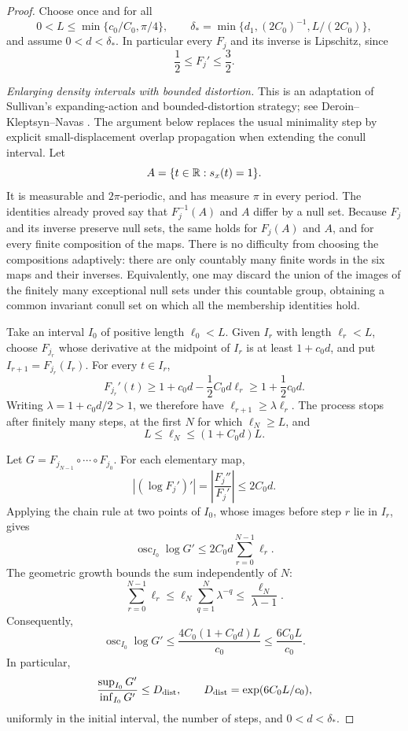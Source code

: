 \begin{proof}
Choose once and for all
\[
 0<L\le\min\{c_0/C_0,\pi/4\},
 \qquad
 \delta_*=\min\{d_1,(2C_0)^{-1},L/(2C_0)\},
\]
and assume \(0<d<\delta_*\).  In particular every \(F_j\) and its
inverse is Lipschitz, since
\[
 \frac12\le F_j'\le\frac32.
\]

\smallskip
\noindent\emph{Enlarging density intervals with bounded distortion.}
This is an adaptation of Sullivan's expanding-action and bounded-distortion
strategy; see Deroin--Kleptsyn--Navas \cite[Section~2.1]{DeroinKleptsynNavas2008}.
The argument below replaces the usual minimality step by explicit
small-displacement overlap propagation when extending the conull interval.
Let
\[
 A=\{t\in\mathbb R:s_x(t)=1\}.
\]
It is measurable and \(2\pi\)-periodic, and has measure \(\pi\)
in every period.  The identities already proved say that
\(F_j^{-1}(A)\) and \(A\) differ by a null set.  Because \(F_j\)
and its inverse preserve null sets, the same holds for
\(F_j(A)\) and \(A\), and for every finite composition of the maps.
There is no difficulty from choosing the compositions adaptively:
there are only countably many finite words in the six maps and
their inverses.  Equivalently, one may discard the union of the
images of the finitely many exceptional null sets under this
countable group, obtaining a common invariant conull set on which
all the membership identities hold.

Take an interval \(I_0\) of positive length \(\ell_0<L\).
Given \(I_r\) with length \(\ell_r<L\), choose \(F_{j_r}\) whose
derivative at the midpoint of \(I_r\) is at least \(1+c_0d\), and
put \(I_{r+1}=F_{j_r}(I_r)\).  For every \(t\in I_r\),
\[
 F_{j_r}'(t)
 \ge1+c_0d-\frac12C_0d\ell_r
 \ge1+\frac12c_0d.
\]
Writing \(\lambda=1+c_0d/2>1\), we therefore have
\(\ell_{r+1}\ge\lambda\ell_r\).  The process stops after finitely
many steps, at the first \(N\) for which \(\ell_N\ge L\), and
\[
 L\le\ell_N\le(1+C_0d)L.
\]

Let \(G=F_{j_{N-1}}\circ\cdots\circ F_{j_0}\).
For each elementary map,
\[
 |(\log F_j')'|=\left|\frac{F_j''}{F_j'}\right|\le2C_0d.
\]
Applying the chain rule at two points of \(I_0\), whose images
before step \(r\) lie in \(I_r\), gives
\[
 \operatorname{osc}_{I_0}\log G'
 \le2C_0d\sum_{r=0}^{N-1}\ell_r.
\]
The geometric growth bounds the sum independently of \(N\):
\[
 \sum_{r=0}^{N-1}\ell_r
 \le\ell_N\sum_{q=1}^{N}\lambda^{-q}
 \le\frac{\ell_N}{\lambda-1}.
\]
Consequently,
\begin{equation}\label{eq:palettes-binary-distortion}
 \operatorname{osc}_{I_0}\log G'
 \le\frac{4C_0(1+C_0d)L}{c_0}
 \le\frac{6C_0L}{c_0}.
\end{equation}
In particular,
\[
 \frac{\sup_{I_0}G'}{\inf_{I_0}G'}
 \le D_{\rm dist},\qquad D_{\rm dist}=\exp(6C_0L/c_0),
\]
uniformly in the initial interval, the number of steps, and
\(0<d<\delta_*\).


\end{proof}
